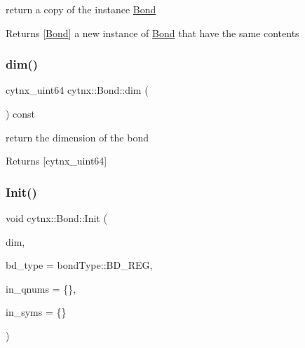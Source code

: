 return a copy of the instance \hyperlink{classcytnx_1_1Bond}{Bond} 

\begin{DoxyReturn}{Returns}
\mbox{[}\hyperlink{classcytnx_1_1Bond}{Bond}\mbox{]} a new instance of \hyperlink{classcytnx_1_1Bond}{Bond} that have the same contents 
\end{DoxyReturn}
\mbox{\label{classcytnx_1_1Bond_aa072647e03a4c797479445bd41b9eacf}} 
\subsubsection{\texorpdfstring{dim()}{dim()}}
{\footnotesize\ttfamily cytnx\+\_\+uint64 cytnx\+::\+Bond\+::dim (\begin{DoxyParamCaption}{ }\end{DoxyParamCaption}) const\hspace{0.3cm}{\ttfamily [inline]}}



return the dimension of the bond 

\begin{DoxyReturn}{Returns}
\mbox{[}cytnx\+\_\+uint64\mbox{]} 
\end{DoxyReturn}
\mbox{\label{classcytnx_1_1Bond_a707a803fa98fb6a87b5f3c3b3000509f}} 
\subsubsection{\texorpdfstring{Init()}{Init()}}
{\footnotesize\ttfamily void cytnx\+::\+Bond\+::\+Init (\begin{DoxyParamCaption}\item[{const cytnx\+\_\+uint64 \&}]{dim,  }\item[{const bond\+Type \&}]{bd\+\_\+type = {\ttfamily bondType\+:\+:BD\+\_\+REG},  }\item[{const std\+::vector$<$ std\+::vector$<$ cytnx\+\_\+int64 $>$ $>$ \&}]{in\+\_\+qnums = {\ttfamily \{\}},  }\item[{const std\+::vector$<$ \hyperlink{classcytnx_1_1Symmetry}{Symmetry} $>$ \&}]{in\+\_\+syms = {\ttfamily \{\}} }\end{DoxyParamCaption})\hspace{0.3cm}{\ttfamily [inline]}}



